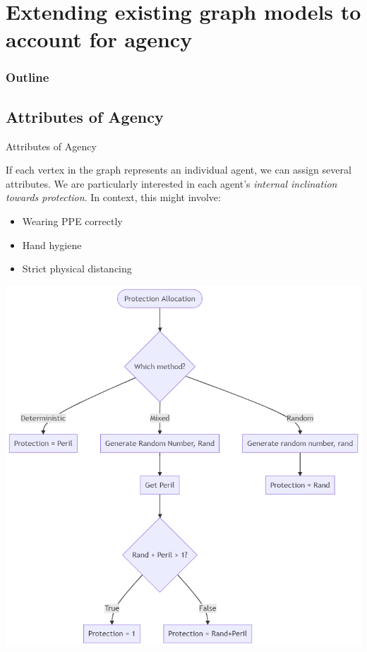 \documentclass[unknownkeysallowed]{beamer}
\begin{document}
\section{Extending existing graph models to account for agency}

\begin{frame}
  \frametitle{Outline}
  \tableofcontents[currentsection]
\end{frame}
\subsection{Attributes of Agency}
\begin{frame}{Attributes of Agency}

If each vertex in the graph represents an individual agent, we can assign several attributes. We are particularly interested in each agent's {\it internal inclination towards protection}. In context, this might involve:
\begin{itemize}
	\pause
	\item Wearing PPE correctly
	\pause
	\item Hand hygiene
	\pause
	\item Strict physical distancing
\end{itemize}

\end{frame}

\begin{frame}
\centering\includegraphics[height=.9\textheight]{assets/flowcharts/protection}
\end{frame}
\end{document}
